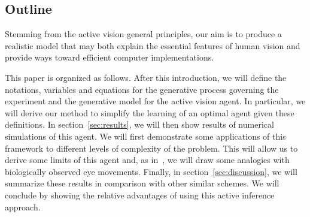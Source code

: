 \subsection{Outline}



\fi Stemming from the active vision general principles, our aim is to produce a realistic model that may both explain the essential features of human vision and provide ways toward efficient computer implementations. 

\CNS
This paper is organized as follows. After this introduction, we will define the notations, variables and equations for the generative process governing the experiment and the generative model for the active vision agent. In particular, we will derive our method to simplify the learning of an optimal agent given these definitions. In section~\ref{sec:results}, we will then show results of numerical simulations of this agent. We will first demonstrate some applications of this framework to different levels of complexity of the problem. This will allow us to derive some limits of this agent and, as in~\citep{Najemnik05}, we will draw some analogies with biologically observed eye movements. Finally, in section~\ref{sec:discussion}, we will summarize these results in comparison with other similar schemes. We will conclude by showing the relative advantages of using this active inference approach.
\fi